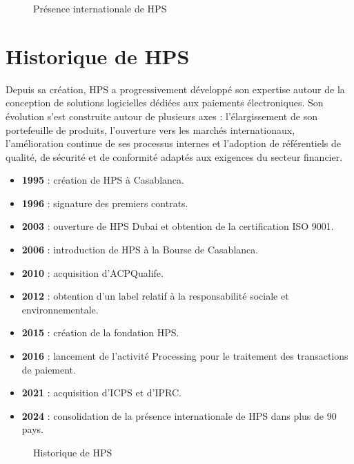 \begin{figure}[h!]
    \centering
    \caption{Présence internationale de HPS}
    \label{fig:presence-hps}
\end{figure}

\section{Historique de HPS}

Depuis sa création, HPS a progressivement développé son expertise autour de la conception de solutions logicielles dédiées aux paiements électroniques. Son évolution s'est construite autour de plusieurs axes : l'élargissement de son portefeuille de produits, l'ouverture vers les marchés internationaux, l'amélioration continue de ses processus internes et l'adoption de référentiels de qualité, de sécurité et de conformité adaptés aux exigences du secteur financier.

\begin{itemize}
    \item \textbf{1995} : création de HPS à Casablanca.
    \item \textbf{1996} : signature des premiers contrats.
    \item \textbf{2003} : ouverture de HPS Dubai et obtention de la certification ISO 9001.
    \item \textbf{2006} : introduction de HPS à la Bourse de Casablanca.
    \item \textbf{2010} : acquisition d'ACPQualife.
    \item \textbf{2012} : obtention d'un label relatif à la responsabilité sociale et environnementale.
    \item \textbf{2015} : création de la fondation HPS.
    \item \textbf{2016} : lancement de l'activité Processing pour le traitement des transactions de paiement.
    \item \textbf{2021} : acquisition d'ICPS et d'IPRC.
    \item \textbf{2024} : consolidation de la présence internationale de HPS dans plus de 90 pays.
\end{itemize}

\begin{figure}[h!]
    \centering
    \caption{Historique de HPS}
    \label{fig:historique-hps}
\end{figure}

